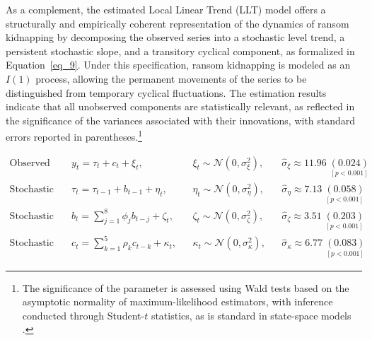 \documentclass[12pt,a4paper]{article}
\providecommand{\parencite}{\citep}
\theoremstyle{plain}
\theoremstyle{definition}
\theoremstyle{remark}
\newcommand{\1}{\mathbf{1}}
\begin{document}
As a complement, the estimated Local Linear Trend (LLT) model offers a structurally
and empirically coherent representation of the dynamics of ransom kidnapping by
decomposing the observed series into a stochastic level trend, a persistent stochastic
slope, and a transitory cyclical component, as formalized in Equation~\ref{eq_9}.
Under this specification, ransom kidnapping is modeled as an $I(1)$ process, allowing
the permanent movements of the series to be distinguished from temporary cyclical
fluctuations. The estimation results indicate that all unobserved components are
statistically relevant, as reflected in the significance of the variances associated
with their innovations, with standard errors reported in parentheses.\footnote{The
significance of the parameter is assessed using Wald tests based on the asymptotic
normality of maximum-likelihood estimators, with inference conducted through
Student-\(t\) statistics, as is standard in state-space models
\parencite{Wald1943,Greene2012}.}

\begin{equation}
\begin{aligned}
\text{Observed series:} \quad & y_t = \tau_t + c_t + \xi_t, 
&& \xi_t \sim \mathcal{N}(0,\sigma_\xi^2), 
&& \hat{\sigma}_\xi \approx 11.96 \; \underset{[p<0.001]}{(0.024)} \\[10pt]
\text{Stochastic trend:} \quad & \tau_t = \tau_{t-1} + b_{t-1} + \eta_t, 
&& \eta_t \sim \mathcal{N}(0, \sigma_\eta^2), 
&& \hat{\sigma}_\eta \approx 7.13 \; \underset{[p<0.001]}{(0.058)} \\[10pt]
\text{Stochastic slope:} \quad & b_t = \sum_{j=1}^{8} \phi_j b_{t-j} + \zeta_t, 
&& \zeta_t \sim \mathcal{N}(0, \sigma_\zeta^2), 
&& \hat{\sigma}_\zeta \approx 3.51 \; \underset{[p<0.001]}{(0.203)} \\[10pt]
\text{Stochastic cycle:} \quad & c_t = \sum_{k=1}^{5} \rho_k c_{t-k} + \kappa_t, 
&& \kappa_t \sim \mathcal{N}(0, \sigma_\kappa^2), 
&& \hat{\sigma}_\kappa \approx 6.77 \; \underset{[p<0.001]}{(0.083)}
\end{aligned}
\label{eq_9}
\end{equation}
\end{document}
